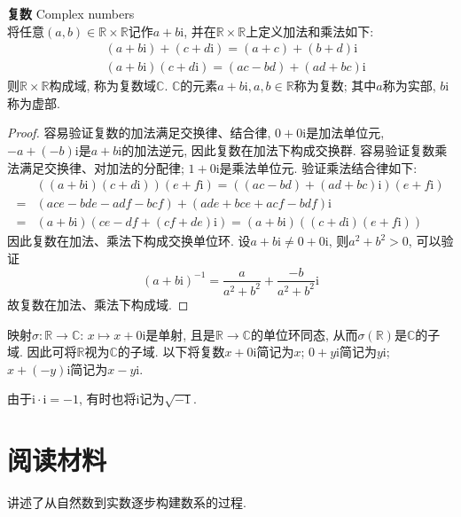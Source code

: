 \begin{dfn}  \textbf{复数} Complex numbers\\
将任意$(a,b)\in \mathbb{R}\times \mathbb{R}$记作$a+b\mathrm{i}$, 并在$\mathbb{R}\times \mathbb{R}$上定义加法和乘法如下:
\begin{align}
    &(a+b\mathrm{i})+(c+d\mathrm{i})=(a+c)+(b+d)\mathrm{i}\\
    &(a+b\mathrm{i}) (c+d\mathrm{i}) = (ac-bd)+(ad+bc)\mathrm{i}
\end{align}
则$\mathbb{R}\times \mathbb{R}$构成域, 称为复数域$\mathbb{C}$. $\mathbb{C}$的元素$a+b\mathrm{i}, a,b\in \mathbb{R}$称为复数; 其中$a$称为实部, $b\mathrm{i}$称为虚部. 
\end{dfn}

\begin{proof}
容易验证复数的加法满足交换律、结合律, $0+0\mathrm{i}$是加法单位元, $-a+(-b)\mathrm{i}$是$a+b\mathrm{i}$的加法逆元, 因此复数在加法下构成交换群. 容易验证复数乘法满足交换律、对加法的分配律; $1+0\mathrm{i}$是乘法单位元. 验证乘法结合律如下:
\begin{align*}
    &((a+b\mathrm{i})(c+d\mathrm{i}))(e+f\mathrm{i})
    = ((ac-bd)+(ad+bc)\mathrm{i})(e+f\mathrm{i})\\
    =& (ace-bde-adf-bcf)+(ade+bce+acf-bdf)\mathrm{i}\\
    =& (a+b\mathrm{i})(ce-df+(cf+de)\mathrm{i})
    = (a+b\mathrm{i})((c+d\mathrm{i})(e+f\mathrm{i}))
\end{align*}
因此复数在加法、乘法下构成交换单位环. 设$a+b\mathrm{i}\neq 0+0\mathrm{i}$, 则$a^2+b^2>0$, 可以验证
\begin{equation}
    (a+b\mathrm{i})^{-1} = \frac{a}{a^2+b^2} + \frac{-b}{a^2+b^2}\mathrm{i}
\end{equation}
故复数在加法、乘法下构成域. 
\end{proof}
映射$\sigma: \mathbb{R} \to \mathbb{C}$: $x\mapsto x+0\mathrm{i}$是单射, 且是$\mathbb{R} \to \mathbb{C}$的单位环同态, 从而$\sigma(\mathbb{R})$是$\mathbb{C}$的子域. 因此可将$\mathbb{R}$视为$\mathbb{C}$的子域. 以下将复数$x+0\mathrm{i}$简记为$x$; $0+y\mathrm{i}$简记为$y\mathrm{i}$; $x+(-y)\mathrm{i}$简记为$x-y\mathrm{i}$. 

由于$\mathrm{i}\cdot \mathrm{i}=-1$, 有时也将$\mathrm{i}$记为$\sqrt{-1}$. 


\section*{阅读材料}

\par \cite{AnT1}讲述了从自然数到实数逐步构建数系的过程. 


